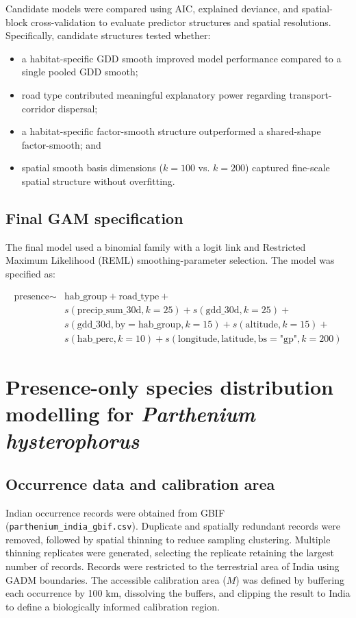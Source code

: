 Candidate models were compared using AIC, explained deviance, and spatial-block cross-validation to evaluate predictor structures and spatial resolutions. Specifically, candidate structures tested whether:

\begin{itemize}
    \item a habitat-specific GDD smooth improved model performance compared to a single pooled GDD smooth;
    \item road type contributed meaningful explanatory power regarding transport-corridor dispersal;
    \item a habitat-specific factor-smooth structure outperformed a shared-shape factor-smooth; and
    \item spatial smooth basis dimensions ($k = 100$ vs. $k = 200$) captured fine-scale spatial structure without overfitting.
\end{itemize}

\subsection{Final GAM specification}

The final model used a binomial family with a logit link and Restricted Maximum Likelihood (REML) smoothing-parameter selection. The model was specified as:

$$
\begin{aligned}
\text{presence} \sim {} & \text{hab\_group} + \text{road\_type} + \\
& s(\text{precip\_sum\_30d}, k=25) + s(\text{gdd\_30d}, k=25) + \\
& s(\text{gdd\_30d}, \text{by}=\text{hab\_group}, k=15) + s(\text{altitude}, k=15) + \\
& s(\text{hab\_perc}, k=10) + s(\text{longitude}, \text{latitude}, \text{bs}=\text{"gp"}, k=200)
\end{aligned}
$$

\section{Presence-only species distribution modelling for \textit{Parthenium hysterophorus}}

\subsection{Occurrence data and calibration area}

Indian occurrence records were obtained from GBIF (\texttt{parthenium\_india\_gbif.csv}). Duplicate and spatially redundant records were removed, followed by spatial thinning to reduce sampling clustering. Multiple thinning replicates were generated, selecting the replicate retaining the largest number of records. Records were restricted to the terrestrial area of India using GADM boundaries. The accessible calibration area ($M$) was defined by buffering each occurrence by 100 km, dissolving the buffers, and clipping the result to India to define a biologically informed calibration region.

